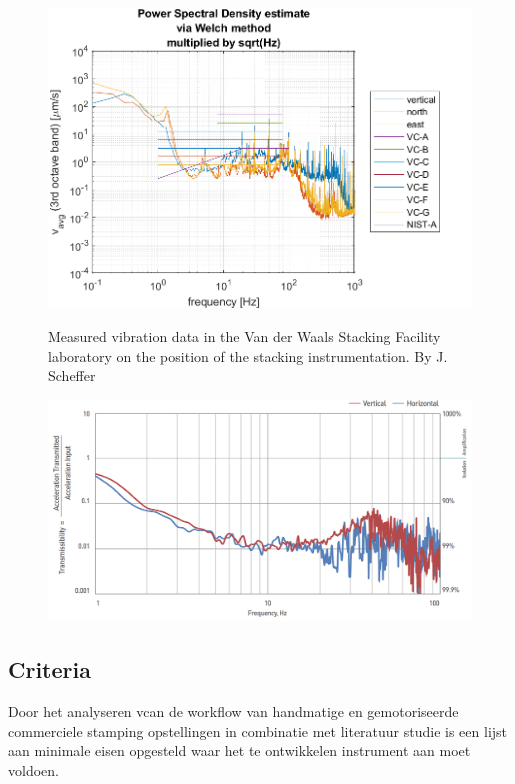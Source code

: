 \documentclass[11pt]{article}
\begin{document}
\begin{figure}[H]
  \centering
  \begin{minipage}[b]{0.49\textwidth}
    \includegraphics[width=\textwidth]{img/resonance/geophone_measurement_position_1.png}
    \caption{Measured vibration data in the Van der Waals Stacking Facility laboratory on the position of the stacking instrumentation. By J. Scheffer}
    \label{fig:GEOPhone_measurement}
  \end{minipage}
  \hfill
  \begin{minipage}[b]{0.49\textwidth}
    \includegraphics[width=\textwidth]{img/resonance/damping_table_response.png}
    \caption{}
    \label{fig:damp_table_response}
  \end{minipage}
\end{figure}


\subsection{Criteria}
Door het analyseren vcan de workflow van handmatige en gemotoriseerde commerciele stamping opstellingen in combinatie met literatuur studie is een lijst aan minimale eisen opgesteld waar het te ontwikkelen instrument aan moet voldoen.
\end{document}
